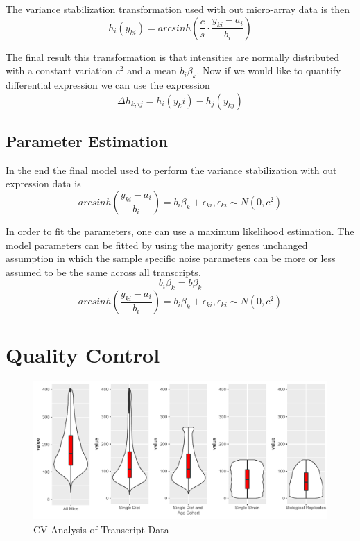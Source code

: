 \documentclass[a4paper]{book}
\begin{document}
	The variance stabilization transformation used with out micro-array data is then
	$$h_i(y_{ki}) = arcsinh(\dfrac{c}{s}{\cdot}\dfrac{y_{ki} - a_i}{b_i}) $$
	
	\begin{minipage}{\linewidth}%
		The final result this transformation is that intensities are normally distributed with a constant variation $c^2$ and a mean $b_i\beta_k$. Now if we would like to quantify differential expression we can use the expression
		$$ {\Delta}h_{k,ij} = h_i(y_ki) - h_j(y_{kj}) $$
	\end{minipage}
	
	
	\subsection{Parameter Estimation}
	
	In the end the final model used to perform the variance stabilization with out expression data is
	$$ arcsinh(\dfrac{y_{ki}-a_i}{b_i}) = b_i\beta_k + \epsilon_{ki}, \epsilon_{ki} \sim N(0,c^2)$$
	
	In order to fit the parameters, one can use a maximum likelihood estimation. The model parameters can be fitted by using the majority genes unchanged assumption in which the sample specific noise parameters can be more or less assumed to be the same across all transcripts. 
	$$ b_i\beta_k = b\beta_k $$
	$$ arcsinh(\dfrac{y_{ki}-a_i}{b_i}) = b_i\beta_k + \epsilon_{ki}, \epsilon_{ki} \sim N(0,c^2)$$
	
	
	\section{Quality Control}
	
	\begin{figure}[htb!]
		\centering
		\includegraphics[width=.9\linewidth]{3.Trancriptomics/transcript_CV_figure}
		\caption{CV Analysis of Transcript Data}
		\label{fig:transcriptcvfigure}
	\end{figure}
	
\end{document}

